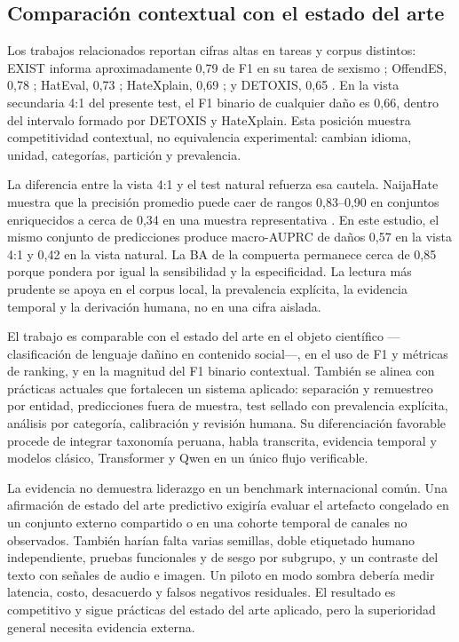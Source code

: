 \subsection{Comparación contextual con el estado del arte}

Los trabajos relacionados reportan cifras altas en tareas y corpus distintos: EXIST informa aproximadamente 0,79 de F1 en su tarea de sexismo \cite{rodriguez2021exist}; OffendES, 0,78 \cite{plaza2021offendes}; HatEval, 0,73 \cite{basile2019hateval}; HateXplain, 0,69 \cite{mathew2021hatexplain}; y DETOXIS, 0,65 \cite{taule2021detoxis}. En la vista secundaria 4:1 del presente test, el F1 binario de cualquier daño es 0,66, dentro del intervalo formado por DETOXIS y HateXplain. Esta posición muestra competitividad contextual, no equivalencia experimental: cambian idioma, unidad, categorías, partición y prevalencia.

La diferencia entre la vista 4:1 y el test natural refuerza esa cautela. NaijaHate muestra que la precisión promedio puede caer de rangos 0,83--0,90 en conjuntos enriquecidos a cerca de 0,34 en una muestra representativa \cite{tonneau2024naijahate}. En este estudio, el mismo conjunto de predicciones produce macro-AUPRC de daños 0,57 en la vista 4:1 y 0,42 en la vista natural. La BA de la compuerta permanece cerca de 0,85 porque pondera por igual la sensibilidad y la especificidad. La lectura más prudente se apoya en el corpus local, la prevalencia explícita, la evidencia temporal y la derivación humana, no en una cifra aislada.

El trabajo es comparable con el estado del arte en el objeto científico ---clasificación de lenguaje dañino en contenido social---, en el uso de F1 y métricas de ranking, y en la magnitud del F1 binario contextual. También se alinea con prácticas actuales que fortalecen un sistema aplicado: separación y remuestreo por entidad, predicciones fuera de muestra, test sellado con prevalencia explícita, análisis por categoría, calibración y revisión humana. Su diferenciación favorable procede de integrar taxonomía peruana, habla transcrita, evidencia temporal y modelos clásico, Transformer y Qwen en un único flujo verificable.

La evidencia no demuestra liderazgo en un benchmark internacional común. Una afirmación de estado del arte predictivo exigiría evaluar el artefacto congelado en un conjunto externo compartido o en una cohorte temporal de canales no observados. También harían falta varias semillas, doble etiquetado humano independiente, pruebas funcionales y de sesgo por subgrupo, y un contraste del texto con señales de audio e imagen. Un piloto en modo sombra debería medir latencia, costo, desacuerdo y falsos negativos residuales. El resultado es competitivo y sigue prácticas del estado del arte aplicado, pero la superioridad general necesita evidencia externa.

